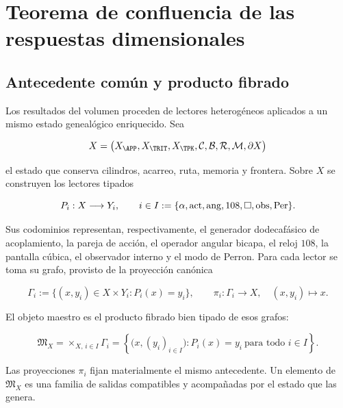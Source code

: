 \section{Teorema de confluencia de las respuestas dimensionales}
\label{rm:ch:confluencia-general}

\subsection{Antecedente com\'un y producto fibrado}

Los resultados del volumen proceden de lectores heterog\'eneos aplicados a
un mismo estado geneal\'ogico enriquecido.  Sea

\begin{equation}
 X=\bigl(X_{\APP},X_{\TRIT},X_{\TPK},
          \mathcal C,\mathcal B,\mathcal R,\mathcal M,\partial X\bigr)
 \label{rm:eq:confluence-state}
\end{equation}

el estado que conserva cilindros, acarreo, ruta, memoria y frontera. Sobre
\(X\) se construyen los lectores tipados

\begin{equation}
 P_i:X\longrightarrow Y_i,
 \qquad
 i\in I:=\{\alpha,{\rm act},{\rm ang},108,\square,{\rm obs},{\rm Per}\}.
 \label{rm:eq:confluence-objects}
\end{equation}

Sus codominios representan, respectivamente, el generador dodecaf\'asico de
acoplamiento, la pareja de acci\'on, el operador angular bicapa, el reloj
\(108\), la pantalla c\'ubica, el observador interno y el modo de Perron.
Para cada lector se toma su grafo, provisto de la proyecci\'on can\'onica

\begin{equation}
 \Gamma_i:=\{(x,y_i)\in X\times Y_i:P_i(x)=y_i\},
 \qquad
 \pi_i:\Gamma_i\longrightarrow X,
 \quad (x,y_i)\longmapsto x.
 \label{rm:eq:confluence-reader-graphs}
\end{equation}

El objeto maestro es el producto fibrado bien tipado de esos grafos:

\begin{equation}
 \boxed{
 \mathfrak M_X=
 \mathop{\times}_{X,\,i\in I}\Gamma_i
 =\left\{\bigl(x,(y_i)_{i\in I}\bigr):
 P_i(x)=y_i\ \text{para todo }i\in I\right\}.}
 \label{rm:eq:master-fiber-product}
\end{equation}

Las proyecciones \(\pi_i\) fijan materialmente el mismo antecedente. Un
elemento de \(\mathfrak M_X\) es una familia de salidas compatibles y
acompa\~nadas por el estado que las genera.

